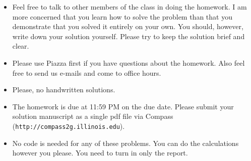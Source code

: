 
\usepackage{graphicx,amsmath,amssymb,url,epstopdf}
\sloppy
\oddsidemargin 0in
\evensidemargin 0in
\textwidth 6.5in
\topmargin -0.5in
\textheight 9.0in

\newcommand{\bb}[1]{\bf #1}
\newcommand{\ignore}[1]{}
\newcommand{\pp}{\noindent}
\newcommand{\ov}{\overline}
\renewcommand{\labelitemii}{\tiny$\circ$}



\begin{footnotesize}
\begin{itemize}

\item Feel free to talk to other members of the class in doing the homework.  I am
more concerned that you learn how to solve the problem than that you
demonstrate that you solved it entirely on your own.  You should, however,
write down your solution yourself.  Please try to keep the solution brief and
clear.
\item Please use Piazza first if you have questions about the homework.
  Also feel free to send us e-mails and come to office hours.

\item Please, no handwritten solutions.

\item The homework is due at 11:59 PM on the due date. Please submit your solution manuscript as a single pdf file via Compass
(\texttt{http://compass2g.illinois.edu}).

\item No code is needed for any of these problems. You can do the
calculations however you please. You need to turn in only the report.

\end{itemize}
\end{footnotesize}

